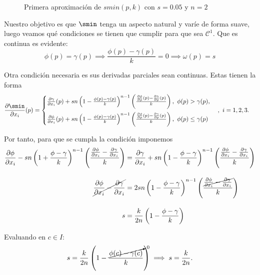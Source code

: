 \begin{figure}[!h]
\begin{minipage}[c]{0.49\linewidth}
        \caption{$k=0.1$}
     \end{minipage}
     \caption{Primera aproximación de $smin(p,k)$ con $s=0.05$ y $n=2$}
     \label{fig:smooth1}
\end{figure}

Nuestro objetivo es que $\smin$ tenga un aspecto natural y varíe de forma suave, luego veamos qué condiciones se tienen que cumplir para que sea $\mathcal{C}^1$. Que es continua es evidente:
\begin{equation*}
    \phi(p)=\gamma(p) \implies \frac{\phi(p)-\gamma(p)}{k} = 0\implies \omega(p) = s
\end{equation*}

Otra condición necesaria es sus derivadas parciales sean continuas. Estas tienen la forma
\begin{align*}
    \frac{\partial \smin}{\partial x_i}(p) &= \begin{cases}
        \frac{\partial \gamma}{\partial x_i}(p)+ sn\left(1-\frac{\phi(p)-\gamma(p)}{k}\right)^{n-1}\left(\frac{ \frac{\partial \phi}{\partial p}(p)-\frac{\partial \gamma}{\partial p}(p)}{k}\right),\ \phi(p)>\gamma(p), \\[10pt] 
        \frac{\partial \phi}{\partial x_i}(p)+ sn\left(1-\frac{\phi(p)-\gamma(p)}{k}\right)^{n-1}\left(\frac{ \frac{\partial \phi}{\partial p}(p)-\frac{\partial \gamma}{\partial p}(p)}{k}\right),\ \phi(p)\le\gamma(p)
    \end{cases},\ i=1,2,3.
\end{align*}

Por tanto, para que se cumpla la condición imponemos
\begin{align*}
     \frac{\partial \phi}{\partial x_i} - sn\left(1+\frac{\phi-\gamma}{k}\right)^{n-1}\left(\frac{\frac{\partial \phi}{\partial x_i}-\frac{\partial \gamma}{\partial x_i}}{k}\right) &= \frac{\partial \gamma}{\partial x_i} + sn\left(1-\frac{\phi-\gamma}{k}\right)^{n-1}\left(\frac{\frac{\partial \phi}{\partial x_i}-\frac{\partial \gamma}{\partial x_i}}{k}\right)\\[10pt]
     \cancel{\frac{\partial \phi}{\partial x_i} - \frac{\partial \gamma}{\partial x_i}} &= 2sn\left(1-\frac{\phi-\gamma}{k}\right)^{n-1}\left(\frac{ \cancel{\frac{\partial \phi}{\partial x_i}-\frac{\partial \gamma}{\partial x_i}}}{k}\right)\\[10pt]
     s &= \frac{k}{2n}\left(1-\frac{\phi-\gamma}{k}\right)
\end{align*}

Evaluando en $c\in I$:
\begin{align*}
    s = \frac{k}{2n}\left(1-\frac{\cancelto{0}{\phi(c)-\gamma(c)}}{k}\right) \implies s = \frac{k}{2n}.
\end{align*}
    
